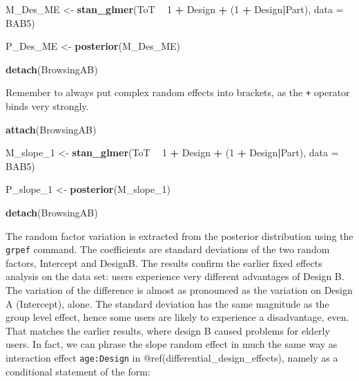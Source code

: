 \documentclass[]{svmono}
\newenvironment{Shaded}{\begin{snugshade}}{\end{snugshade}}
\newcommand{\KeywordTok}[1]{\textcolor[rgb]{0.13,0.29,0.53}{\textbf{#1}}}
\newcommand{\DataTypeTok}[1]{\textcolor[rgb]{0.13,0.29,0.53}{#1}}
\newcommand{\DecValTok}[1]{\textcolor[rgb]{0.00,0.00,0.81}{#1}}
\newcommand{\StringTok}[1]{\textcolor[rgb]{0.31,0.60,0.02}{#1}}
\newcommand{\OperatorTok}[1]{\textcolor[rgb]{0.81,0.36,0.00}{\textbf{#1}}}
\newcommand{\NormalTok}[1]{#1}
\begin{document}
\begin{Shaded}
\begin{Highlighting}[]
\NormalTok{M_Des_ME <-}\StringTok{ }\KeywordTok{stan_glmer}\NormalTok{(ToT }\OperatorTok{~}\StringTok{ }\DecValTok{1} \OperatorTok{+}\StringTok{ }\NormalTok{Design }\OperatorTok{+}\StringTok{ }\NormalTok{(}\DecValTok{1} \OperatorTok{+}\StringTok{ }\NormalTok{Design}\OperatorTok{|}\NormalTok{Part),}
                       \DataTypeTok{data =}\NormalTok{ BAB5)}
\end{Highlighting}
\end{Shaded}

\begin{Shaded}
\begin{Highlighting}[]
\NormalTok{P_Des_ME <-}\StringTok{ }\KeywordTok{posterior}\NormalTok{(M_Des_ME)}
\end{Highlighting}
\end{Shaded}

\begin{Shaded}
\begin{Highlighting}[]
\KeywordTok{detach}\NormalTok{(BrowsingAB)}
\end{Highlighting}
\end{Shaded}

Remember to always put complex random effects into brackets, as the
\texttt{+} operator binds very strongly.

\begin{Shaded}
\begin{Highlighting}[]
\KeywordTok{attach}\NormalTok{(BrowsingAB)}

\NormalTok{M_slope_}\DecValTok{1}\NormalTok{ <-}
\StringTok{  }\KeywordTok{stan_glmer}\NormalTok{(ToT }\OperatorTok{~}\StringTok{ }\DecValTok{1} \OperatorTok{+}\StringTok{ }\NormalTok{Design }\OperatorTok{+}\StringTok{ }\NormalTok{(}\DecValTok{1} \OperatorTok{+}\StringTok{ }\NormalTok{Design}\OperatorTok{|}\NormalTok{Part),}
             \DataTypeTok{data =}\NormalTok{ BAB5)}

\NormalTok{P_slope_}\DecValTok{1}\NormalTok{ <-}\StringTok{ }\KeywordTok{posterior}\NormalTok{(M_slope_}\DecValTok{1}\NormalTok{)}

\KeywordTok{detach}\NormalTok{(BrowsingAB)}
\end{Highlighting}
\end{Shaded}

The random factor variation is extracted from the posterior distribution
using the \texttt{grpef} command. The coefficients are standard
deviations of the two random factors, Intercept and DesignB. The results
confirm the earlier fixed effects analysis on the data set: users
experience very different advantages of Design B. The variation of the
difference is almost as pronounced as the variation on Design A
(Intercept), alone. The standard deviation has the same magnitude as the
group level effect, hence some users are likely to experience a
disadvantage, even. That matches the earlier results, where design B
caused problems for elderly users. In fact, we can phrase the slope
random effect in much the same way as interaction effect
\texttt{age:Design} in @ref(differential\_design\_effects), namely as a
conditional statement of the form:
\end{document}
